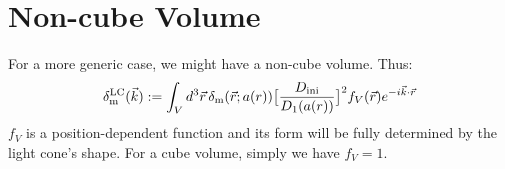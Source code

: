 \documentclass[prd,amsmath,amssymb,floatfix,superscriptaddress,nofootinbib,twocolumn]{revtex4-1}
\def\be{\begin{equation}}
\def\ee{\end{equation}}
\newcommand{\LC}{\rm LC}
\newcommand{\ini}{\rm ini}
\newcommand{\vrr}{\vec{r}}
\newcommand{\vk}{\vec{k}}
\begin{document}


\appendix

\section{Non-cube Volume}
For a more generic case, we might have a non-cube volume. Thus:
\be
\delta^{\LC}_{\rm m}(\vk) :=\int_{V} d^3\vrr  \, \delta_{\rm m}(\vrr;a(r))\big[ \frac{D_{\ini}}{D_{1}(a(r))} \big]^{2}f_{V}(\vrr) e^{-i\vk \cdot\vrr}
\ee
 $f_{V}$ is a position-dependent function and its form will be fully determined by the light cone's shape. For a cube volume, simply we have $f_V=1$.
\end{document}
